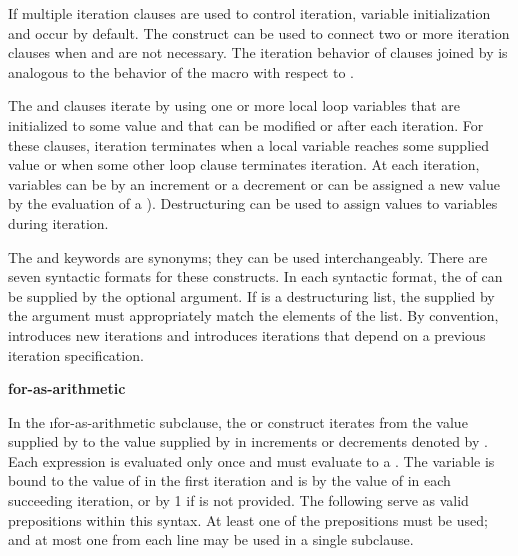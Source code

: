  
If multiple iteration clauses are used to control iteration, variable
initialization and  occur  by default.  
The  construct can be used to connect two or more
iteration clauses when   and 
 are not necessary.
The iteration behavior of clauses joined by 
is analogous to the behavior of the macro  with
respect to .

The  and  clauses iterate by using one or more local 
loop  variables that are initialized to some value and that 
can be modified or  after each iteration.  
For these clauses, iteration terminates when a local
variable reaches some supplied value or when some other loop clause
terminates iteration.
At each iteration, variables can be 
    by an increment or a decrement
or can be assigned a new value by the evaluation of a ).
Destructuring can be used to assign 
values to variables during iteration. 

The  and  keywords are synonyms; they can be used
interchangeably.  There are seven syntactic formats for these constructs.
In each syntactic format, the  of
 can be supplied by the optional 
argument.  If  is a destructuring list, the 
supplied by the  argument must appropriately match
the elements of the list.  
By convention,  introduces new iterations and 
introduces iterations that depend on a previous iteration specification.

{\bf for-as-arithmetic}

In the \i{for-as-arithmetic} subclause, the  
or  construct iterates from the value supplied by
 to the value supplied by  in increments or
decrements denoted by . Each
expression is evaluated only once and must evaluate to a .  
The variable  is bound to the value of 
 in the first iteration and is 
by the value of  in each succeeding iteration,
or by 1 if  is not provided.  
The following  serve as valid prepositions within this 
syntax.
At least one of the 
prepositions must be used; 
and at most one from each line may be used in a single subclause.

